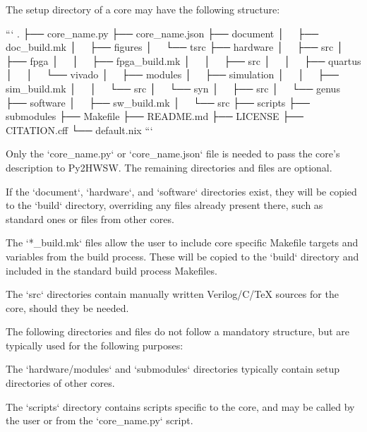 The setup directory of a core may have the following structure:

```
.
├── core_name.py
├── core_name.json
├── document
│   ├── doc_build.mk
│   ├── figures
│   └── tsrc
├── hardware
│   ├── src
│   ├── fpga
│   │   ├── fpga_build.mk
│   │   ├── src
│   │   ├── quartus
│   │   └── vivado
│   ├── modules
│   ├── simulation
│   │   ├── sim_build.mk
│   │   └── src
│   └── syn
│       ├── src
│       └── genus
├── software
│   ├── sw_build.mk
│   └── src
├── scripts
├── submodules
├── Makefile
├── README.md
├── LICENSE
├── CITATION.cff
└── default.nix
```

Only the `core_name.py` or `core_name.json` file is needed to pass the core's description to Py2HWSW.
The remaining directories and files are optional.

If the `document`, `hardware`, and `software` directories exist, they will be copied to the `build` directory, overriding any files already present there, such as standard ones or files from other cores.

The `*_build.mk` files allow the user to include core specific Makefile targets and variables from the build process.
These will be copied to the `build` directory and included in the standard build process Makefiles.

The `src` directories contain manually written Verilog/C/TeX sources for the core, should they be needed.


The following directories and files do not follow a mandatory structure, but are typically used for the following purposes:

The `hardware/modules` and `submodules` directories typically contain setup directories of other cores.

The `scripts` directory contains scripts specific to the core, and may be called by the user or from the `core_name.py` script.

